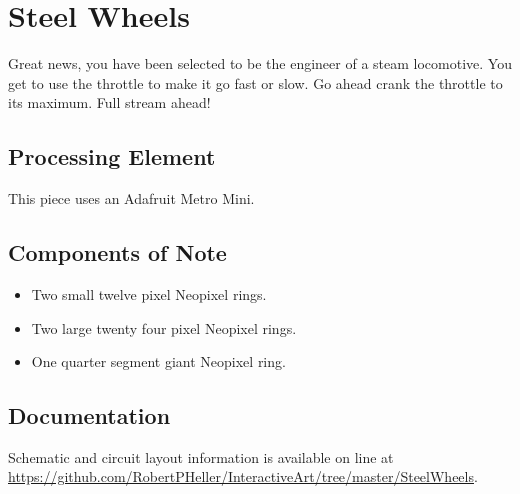 %
%
%
%
% 
%
%
%
%
%
% 
%

\section{Steel Wheels}

Great news, you have been selected to be the engineer of a steam locomotive. 
You get to use the throttle to make it go fast or slow.  Go ahead crank the 
throttle to its maximum.  Full stream ahead!


\subsection*{Processing Element}

This piece uses an Adafruit Metro Mini.

\subsection*{Components of Note}

\begin{itemize}
\item Two small twelve pixel Neopixel rings.
\item Two large twenty four pixel Neopixel rings.
\item One quarter segment giant Neopixel ring.
\end{itemize}

\subsection*{Documentation}

Schematic and circuit layout information is available on line at 
\url{https://github.com/RobertPHeller/InteractiveArt/tree/master/SteelWheels}.
